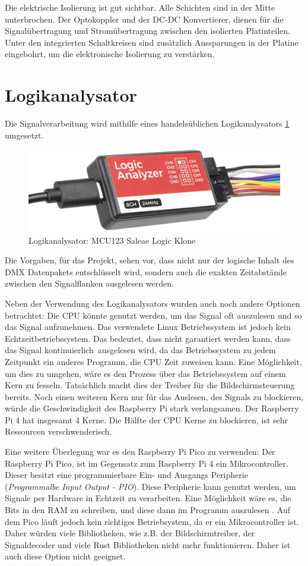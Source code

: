 Die elektrische Isolierung ist gut sichtbar. Alle Schichten sind in der Mitte unterbrochen. Der Optokoppler und der DC-DC Konvertierer, dienen für die Signalübertragung und Stromübertragung zwischen den isolierten Platinteilen. Unter den integrierten Schaltkreisen sind zusätzlich Aussparungen in der Platine eingebohrt, um die elektronische Isolierung zu verstärken.

\section{Logikanalysator}

Die Signalverarbeitung wird mithilfe eines handelsüblichen Logikanalysators \ref{LogicAnalyzer} umgesetzt. 

\begin{figure}[H]
	\centering
	\includegraphics[width=0.6\linewidth]{Pictures/usb-logic-analyzer-side}
	\caption{Logikanalysator: MCU123 Saleae Logic Klone}
	\label{LogicAnalyzer}
\end{figure}


Die Vorgaben, für das Projekt, sehen vor, dass nicht nur der logische Inhalt des DMX Datenpakets entschlüsselt wird, sondern auch die exakten Zeitabstände zwischen den Signalflanken ausgelesen werden.

Neben der Verwendung des Logikanalysators wurden auch noch andere Optionen betrachtet: Die CPU könnte genutzt werden, um das Signal oft auszulesen und so das Signal aufzunehmen. Das verwendete Linux Betriebssystem ist jedoch kein Echtzeitbetriebssystem. Das bedeutet, dass nicht garantiert werden kann, dass das Signal kontinuierlich ausgelesen wird, da das Betriebssystem zu jedem Zeitpunkt ein anderes Programm, die CPU Zeit zuweisen kann. Eine Möglichkeit, um dies zu umgehen, wäre es den Prozess über das Betriebssystem auf einem Kern zu fesseln. Tatsächlich macht dies der Treiber für die Bildschirmsteuerung bereits. Noch einen weiteren Kern nur für das Auslesen, des Signals zu blockieren, würde die Geschwindigkeit des Raspberry Pi stark verlangsamen. Der Raspberry Pi 4 hat insgesamt 4 Kerne. Die Hälfte der CPU Kerne zu blockieren, ist sehr Ressourcen verschwenderisch.

Eine weitere Überlegung war es den Raspberry Pi Pico zu verwenden: Der Raspberry Pi Pico, ist im Gegensatz zum Raspberry Pi 4 ein Mikrocontroller. Dieser besitzt eine programmierbare Ein- und Ausgangs Peripherie (\emph{Programmalbe Input Output - PIO}). Diese Peripherie kann genutzt werden, um Signale per Hardware in Echtzeit zu verarbeiten. Eine Möglichkeit wäre es, die Bits in den RAM zu schreiben, und diese dann im Programm auszulesen \cite[S. 43]{RPiPicoPIO}. Auf dem Pico läuft jedoch kein richtiges Betriebsystem, da er ein Mikrocontroller ist. Daher würden viele Bibliotheken, wie z.B. der Bildschirmtreiber, der Signaldecoder und viele Rust Bibliotheken nicht mehr funktionieren. Daher ist auch diese Option nicht geeignet.

